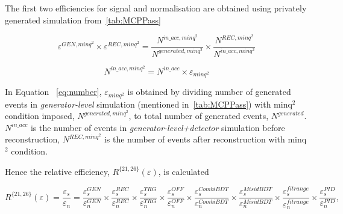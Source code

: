 The first two efficiencies for signal and normalisation are obtained using privately generated simulation from~\autoref{tab:MCPPass}

\begin{equation}
{\varepsilon^{GEN,minq^{2}}}\times {\varepsilon^{REC,minq^{2}}}= \frac{N^{in\_acc,minq^{2}}}{N^{generated,minq^{2}}}\times \frac{N^{REC,minq^{2}}}{N^{in\_acc,minq^{2}}}
\end{equation}

\begin{equation}
N^{in\_acc,minq^{2}} = N^{in\_acc} \times \varepsilon_{minq^{2}}
\label{eq:number}
\end{equation}

In Equation ~\ref{eq:number}, $\varepsilon_{minq^{2}}$ is obtained by dividing number of generated events in \textit{generator-level} simulation (mentioned in~\autoref{tab:MCPPass}) with minq$^2$ condition imposed, $N^{generated,minq^{2}}$, to total number of generated events, $N^{generated}$. $N^{in\_acc}$ is the number of events in \textit{generator-level+detector} simulation before reconstruction, $N^{REC,minq^{2}}$ is the number of events after reconstruction with minq$^2$ condition.

Hence the relative efficiency, $R^{\{21,26\}}(\varepsilon)$, is calculated 


\hspace*{-1.0cm}\begin{equation}
R^{\{21,26\}}(\varepsilon)=\frac{\varepsilon_{s}}{\varepsilon_{n}}=\frac{\varepsilon^{GEN}_{s}}{\varepsilon^{GEN}_{n}} \times \frac{\varepsilon^{REC}_{s}}{\varepsilon^{REC}_{n}} \times \frac{\varepsilon^{TRG}_{s}}{\varepsilon^{TRG}_{n}} \times \frac{\varepsilon^{OFF}_{s}}{\varepsilon^{OFF}_{n}} \times \frac{\varepsilon^{CombiBDT}_{s}}{\varepsilon^{CombiBDT}_{n}} \times \frac{\varepsilon^{MisidBDT}_{s}}{\varepsilon^{MisidBDT}_{n}} \times \frac{\varepsilon^{fitrange}_{s}}{\varepsilon^{fitrange}_{n}} \times \frac{\varepsilon^{PID}_{s}}{\varepsilon^{PID}_{n}},
\label{eq:notsplitted}
\end{equation}

